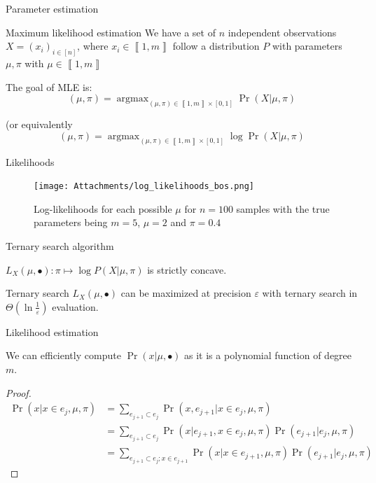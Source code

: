 \documentclass{beamer}
\renewcommand{\epsilon}{\varepsilon}
\DeclareMathOperator*{\argmax}{argmax}
\newcommand{\bbrack}[1]{\left\llbracket#1\right\rrbracket}
\begin{document}
\begin{frame}{Parameter estimation}
    \begin{block}{Maximum likelihood estimation}
        We have a set of $n$ independent observations $X = (x_i)_{i \in [n]}$, where $x_i \in \bbrack{1, m}$ follow a distribution $P$ with parameters $\mu, \pi$ with $\mu \in \bbrack{1, m}$

        The goal of MLE is:
        $$(\mu, \pi) = \argmax_{(\mu, \pi) \in \bbrack{1, m} \times [0, 1]} \Pr(X | \mu, \pi)$$

        (or equivalently 
        $$(\mu, \pi) = \argmax_{(\mu, \pi) \in \bbrack{1, m} \times [0, 1]} \log \Pr(X | \mu, \pi)$$
    \end{block}
\end{frame}

\begin{frame}{Likelihoods}
\begin{figure}
    \centering
    \texttt{[image: Attachments/log\_likelihoods\_bos.png]}
    \caption{Log-likelihoods for each possible $\mu$ for $n = 100$ samples with the true parameters being $m = 5$, $\mu=2$ and $\pi = 0.4$ }
    \label{fig:log_likelihoods}
\end{figure}
\end{frame}

\begin{frame}{Ternary search algorithm}
    \begin{theorem}
        $L_X(\mu, \bullet) : \pi \mapsto \log P(X | \mu, \pi)$ is strictly concave.
    \end{theorem}

    \pause
    
    \begin{block}{Ternary search}
        $L_X(\mu, \bullet)$ can be maximized at precision $\epsilon$ with ternary search in $\Theta(\ln \frac{1}{\epsilon})$ evaluation.
    \end{block}    
\end{frame}


\begin{frame}{Likelihood estimation}
\begin{theorem}
    We can efficiently compute $\Pr(x | \mu, \bullet)$ as it is a polynomial function of degree $m$.
\end{theorem}
\begin{proof}    
    \begin{align}
    \Pr(x | x \in e_j, \mu, \pi) 
    &= \sum_{e_{j+1} \subset e_j} \Pr(x, e_{j+1} | x \in e_j, \mu, \pi) \\
    &= \sum_{e_{j+1} \subset e_j} \Pr(x | e_{j+1}, x \in e_j, \mu, \pi) \Pr(e_{j+1} | e_j, \mu, \pi) \\
    &= \sum_{e_{j+1} \subset e_j ; x\in e_{j+1}} \Pr(x | x \in e_{j+1}, \mu, \pi) \Pr(e_{j+1} | e_j, \mu, \pi)
    \end{align}
\end{proof}
\end{frame}
\end{document}

